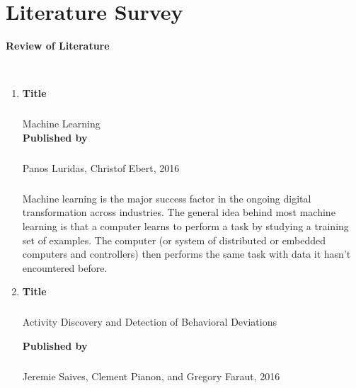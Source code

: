\chapter{Literature Survey}

\begin{Large}
\textbf{Review of Literature}\\
\end{Large}
\vspace*{0.5cm}\\
\begin{enumerate}
	\item	
		\textbf{Title}
			\paragraph{}Machine Learning\\
		
		\textbf{Published by}
			\paragraph{}Panos Luridas, Christof Ebert, 2016
			\paragraph{}Machine learning is the major success factor in the ongoing digital transformation across industries. The general idea behind most machine learning is that a computer learns to perform a task by studying a training set of examples. The computer (or system of distributed or embedded computers and controllers) then performs the same task with data it hasn’t encountered before.\\

	\item
		\textbf{Title}
			\paragraph{}Activity Discovery and Detection of Behavioral Deviations\pagebreak

		\textbf{Published by}
			\paragraph{}Jeremie Saives, Clement Pianon, and Gregory Faraut, 2016

\end{enumerate}
